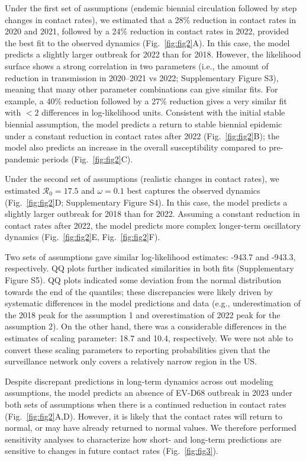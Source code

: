 \documentclass[12pt]{article}
\newcommand{\fref}[1]{Fig.~\ref{fig:#1}}
\begin{document}
Under the first set of assumptions (endemic biennial circulation followed by step changes in contact rates), we estimated that a 28\% reduction in contact rates in 2020 and 2021, followed by a 24\% reduction in contact rates in 2022, provided the best fit to the observed dynamics (\fref{fig2}A).
In this case, the model predicts a slightly larger outbreak for 2022 than for 2018.
However, the likelihood surface shows a strong correlation in two parameters (i.e., the amount of reduction in transmission in 2020--2021 vs 2022; Supplementary Figure S3), meaning that many other parameter combinations can give similar fits.
For example, a 40\% reduction followed by a 27\% reduction gives a very similar fit with $<2$ differences in log-likelihood units.
Consistent with the initial stable biennial assumption, the model predicts a return to stable biennial epidemic under a constant reduction in contact rates after 2022 (\fref{fig2}B);
the model also predicts an increase in the overall susceptibility compared to pre-pandemic periods (\fref{fig2}C).

Under the second set of assumptions (realistic changes in contact rates), we estimated $\mathcal R_0 =17.5$ and $\omega = 0.1$ best captures the observed dynamics (\fref{fig2}D; Supplementary Figure S4).
In this case, the model predicts a slightly larger outbreak for 2018 than for 2022.
Assuming a constant reduction in contact rates after 2022, the model predicts more complex longer-term oscillatory dynamics (\fref{fig2}E, \fref{fig2}F).

Two sets of assumptions gave similar log-likelihood estimates: -943.7 and -943.3, respectively.
QQ plots further indicated similarities in both fits (Supplementary Figure S5).
QQ plots indicated some deviation from the normal distribution towards the end of the quantiles;
these discrepancies were likely driven by systematic differences in the model predictions and data (e.g., underestimation of the 2018 peak for the assumption 1 and overestimation of 2022 peak for the assumption 2).
On the other hand, there was a considerable differences in the estimates of scaling parameter: 18.7 and 10.4, respectively.
We were not able to convert these scaling parameters to reporting probabilities given that the surveillance network only covers a relatively narrow region in the US.

Despite discrepant predictions in long-term dynamics across out modeling assumptions, the model predicts an absence of EV-D68 outbreak in 2023 under both sets of assumptions when there is a continued reduction in contact rates (\fref{fig2}A,D).
However, it is likely that the contact rates will return to normal, or may have already returned to normal values.
We therefore performed sensitivity analyses to characterize how short- and long-term predictions are sensitive to changes in future contact rates (\fref{fig3}).
\end{document}
